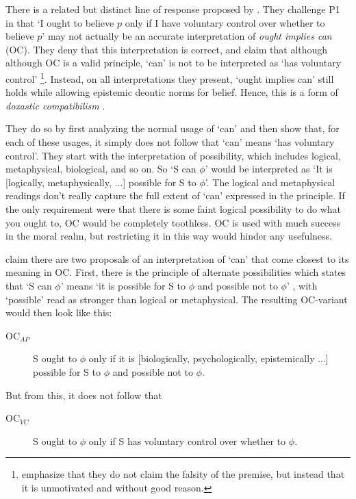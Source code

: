 \documentclass[12pt,numbers=noenddot]{scrartcl}
\begin{document}
There is a related but distinct line of response proposed by \textcite{Chuard2009-CHUENW}. They challenge P1 in that ‘I ought to believe $p$ only if I have voluntary control over whether to believe $p$’ may not actually be an accurate interpretation of \emph{ought implies can} (OC). They deny that this interpretation is correct, and claim that although although OC is a valid principle, ‘can’ is not to be interpreted as ‘has voluntary control’
\footnote{\textcite[601]{Chuard2009-CHUENW} emphasize that they do not claim the falsity of the premise, but instead that it is unmotivated and without good reason.}.
Instead, on all interpretations they present, ‘ought implies can’ still holds while allowing epistemic deontic norms for belief. Hence, this is a form of \emph{doxastic compatibilism} \autocite[682]{Peels2014-PEEADC}.

They do so by first analyzing the normal usage of ‘can’ and then show that, for each of these usages, it simply does not follow that ‘can’ means ‘has voluntary control’. They start with the interpretation of possibility, which includes logical, metaphysical, biological, and so on. So ‘S can $\phi$’ would be interpreted as ‘It is [logically, metaphysically, ...] possible for S to $\phi$’. The logical and metaphysical readings don't really capture the full extent of ‘can’ expressed in the principle. If the only requirement were that there is some faint logical possibility to do what you ought to, OC would be completely toothless. OC is used with much success in the moral realm, but restricting it in this way would hinder any usefulness.

 \textcite[616]{Chuard2009-CHUENW} claim there are two proposals of an interpretation of ‘can’ that come closest to its meaning in OC. First, there is the principle of alternate possibilities which states that ‘S can $\phi$’ means ‘it is possible for S to $\phi$ and possible not to $\phi$’ \autocite[615]{Chuard2009-CHUENW}, with ‘possible’ read as stronger than logical or metaphysical. The resulting OC-variant would then look like this:

 \begin{description}
    \item[OC$_{AP}$] S ought to $\phi$ only if it is [biologically, psychologically, epistemically ...] possible for S to $\phi$ and possible not to $\phi$.
 \end{description}

But from this, it does not follow that
\begin{description}
    \item[OC$_{VC}$] S ought to $\phi$ only if S has voluntary control over whether to $\phi$.
 \end{description}
\end{document}
